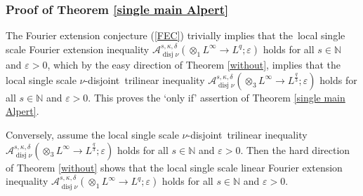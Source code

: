 \documentclass{amsart}%
\theoremstyle{plain}
\numberwithin{equation}{section}
\begin{document}
\subsubsection{Proof of Theorem \ref{single main Alpert}}

The Fourier extension conjecture (\ref{FEC}) trivially implies that the\ local
single scale Fourier extension inequality $\mathcal{A}_{\operatorname*{disj}%
\nu}^{s,\kappa,\delta}\left(  \otimes_{1}L^{\infty}\rightarrow L^{q}%
;\varepsilon\right)  $ holds for all $s\in\mathbb{N}$ and $\varepsilon>0$,
which by the easy direction of Theorem \ref{without}, implies that the local
single scale $\nu$-disjoint\emph{\ }trilinear inequality $\mathcal{A}%
_{\operatorname*{disj}\nu}^{s,\kappa,\delta}\left(  \otimes_{3}L^{\infty
}\rightarrow L^{\frac{q}{3}};\varepsilon\right)  $ holds for all
$s\in\mathbb{N}$ and $\varepsilon>0$. This proves the `only if' assertion of
Theorem \ref{single main Alpert}.

Conversely, assume the local single scale $\nu$-disjoint\emph{\ }trilinear
inequality $\mathcal{A}_{\operatorname*{disj}\nu}^{s,\kappa,\delta}\left(
\otimes_{3}L^{\infty}\rightarrow L^{\frac{q}{3}};\varepsilon\right)  $ holds
for all $s\in\mathbb{N}$ and $\varepsilon>0$. Then the hard direction of
Theorem \ref{without} shows that the local single scale linear Fourier
extension inequality $\mathcal{A}_{\operatorname*{disj}\nu}^{s,\kappa,\delta
}\left(  \otimes_{1}L^{\infty}\rightarrow L^{q};\varepsilon\right)  $ holds
for all $s\in\mathbb{N}$ and $\varepsilon>0$.
\end{document}
